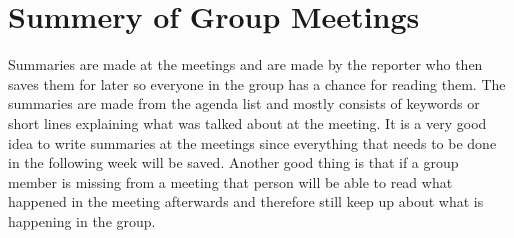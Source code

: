 \section{Summery of Group Meetings}
Summaries are made at the meetings and are made by the reporter who then saves them for later so everyone in the group has a chance for reading them. 
The summaries are made from the agenda list and mostly consists of keywords or short lines explaining what was talked about at the meeting.
It is a very good idea to write summaries at the meetings since everything that needs to be done in the following week will be saved. 
Another good thing is that if a group member is missing from a meeting that person will be able to read what happened in the meeting afterwards and therefore still keep up about what is happening in the group.